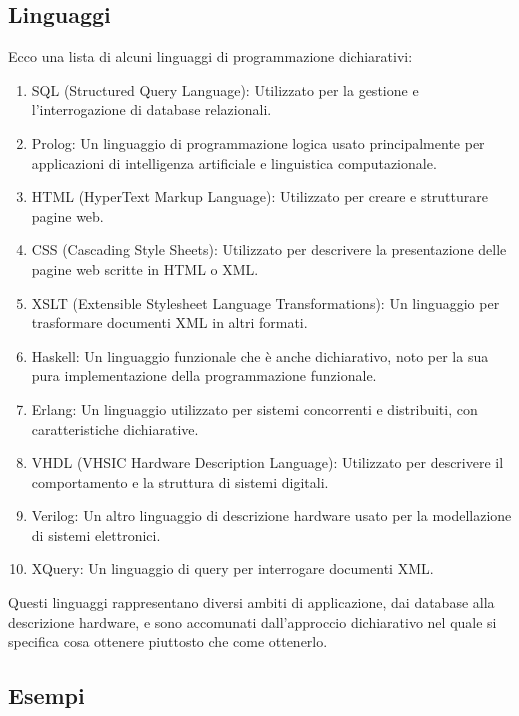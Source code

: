 \documentclass[
  letterpaper,
  DIV=11,
  numbers=noendperiod]{scrreprt}
\providecommand{\tightlist}{%
  \setlength{\itemsep}{0pt}\setlength{\parskip}{0pt}}\usepackage{longtable,booktabs,array}
\begin{document}
\subsection{Linguaggi}\label{linguaggi}

Ecco una lista di alcuni linguaggi di programmazione dichiarativi:

\begin{enumerate}
\def\labelenumi{\arabic{enumi}.}
\tightlist
\item
  SQL (Structured Query Language): Utilizzato per la gestione e
  l'interrogazione di database relazionali.
\item
  Prolog: Un linguaggio di programmazione logica usato principalmente
  per applicazioni di intelligenza artificiale e linguistica
  computazionale.
\item
  HTML (HyperText Markup Language): Utilizzato per creare e strutturare
  pagine web.
\item
  CSS (Cascading Style Sheets): Utilizzato per descrivere la
  presentazione delle pagine web scritte in HTML o XML.
\item
  XSLT (Extensible Stylesheet Language Transformations): Un linguaggio
  per trasformare documenti XML in altri formati.
\item
  Haskell: Un linguaggio funzionale che è anche dichiarativo, noto per
  la sua pura implementazione della programmazione funzionale.
\item
  Erlang: Un linguaggio utilizzato per sistemi concorrenti e
  distribuiti, con caratteristiche dichiarative.
\item
  VHDL (VHSIC Hardware Description Language): Utilizzato per descrivere
  il comportamento e la struttura di sistemi digitali.
\item
  Verilog: Un altro linguaggio di descrizione hardware usato per la
  modellazione di sistemi elettronici.
\item
  XQuery: Un linguaggio di query per interrogare documenti XML.
\end{enumerate}

Questi linguaggi rappresentano diversi ambiti di applicazione, dai
database alla descrizione hardware, e sono accomunati dall'approccio
dichiarativo nel quale si specifica cosa ottenere piuttosto che come
ottenerlo.

\subsection{Esempi}\label{esempi}
\end{document}

